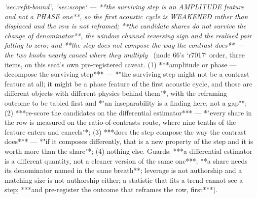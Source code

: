 \begin{description}
\textit{`sec:refit-bound`, `sec:scope` --- **the surviving step is an AMPLITUDE feature and not a PHASE one**, so the first acoustic cycle is WEAKENED rather than displaced and the row is not reframed; **the candidate shares do not survive the change of denominator**, the window channel reversing sign and the realised pair falling to zero; and **the step does not compose the way the contrast does** --- the two knobs nearly cancel where they multiply} \ (node 66's `r7017` order, three items, on this seat's own pre-registered caveat. (1) ***amplitude or phase --- decompose the surviving step*** --- *"the surviving step might not be a contrast feature at all; it might be a phase feature of the first acoustic cycle, and those are different objects with different physics behind them"*, with the reframing outcome to be tabled first and *"an inseparability is a finding here, not a gap"*; (2) ***re-score the candidates on the differential estimator*** --- *"every share in the row is measured on the ratio-of-contrasts route, where nine tenths of the feature enters and cancels"*; (3) ***does the step compose the way the contrast does*** --- *"if it composes differently, that is a new property of the step and it is worth more than the share"*; (4) nothing else.  Guards: ***a differential estimator is a different quantity, not a cleaner version of the same one***; **a share needs its denominator named in the same breath**; leverage is not authorship and a matching size is not authorship either; a statistic that fits a trend cannot see a step; ***and pre-register the outcome that reframes the row, first***). 

\end{description}
